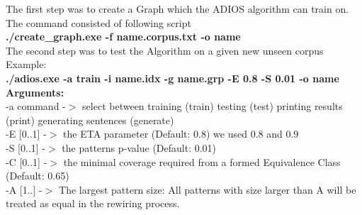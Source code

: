\def\DevnagVersion{2.15}\documentclass[14 pt]{article}
\begin{document}
The first step was to create a Graph which the ADIOS algorithm can train on.\\

The command consisted of following script\\

{\bf  ./create\_graph.exe -f name.corpus.txt -o name} \\

The second step was to test the Algorithm on a given new unseen corpus \\

Example: \\
{\bf ./adios.exe -a train -i name.idx -g name.grp -E 0.8 -S 0.01 -o name} \\

{\bf Arguments:}\\


-a command     -$>$ select between training (train) testing (test) printing results (print) generating sentences (generate)\\

-E [0..1]      -$>$ the ETA parameter  (Default: 0.8) we used 0.8 and 0.9\\

-S [0..1]      -$>$ the patterns p-value  (Default: 0.01)\\

-C [0..1]      -$>$ the minimal coverage required from a formed Equivalence Class  (Default: 0.65)\\

-A [1..]       -$>$ The largest pattern size: All patterns with size larger than A will be treated as equal in the rewiring process.\\ 
\end{document}
